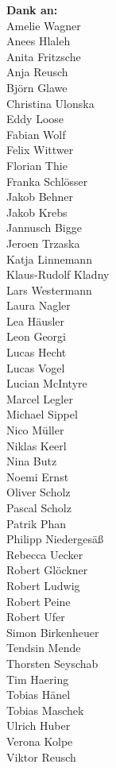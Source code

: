 \begin{minipage}[t][\textheight][b]{.25\textwidth}
\footnotesize
\raggedleft
\textbf{Dank an:}\\[1\baselineskip]
Amelie Wagner\\
Anees Hlaleh\\
Anita Fritzsche\\
Anja Reusch\\
Björn Glawe\\
Christina Ulonska\\
Eddy Loose\\
Fabian Wolf\\
Felix Wittwer\\
Florian Thie\\
Franka Schlösser\\
Jakob Behner\\
Jakob Krebs\\
Jannusch Bigge\\
Jeroen Trzaska\\
Katja Linnemann\\
Klaus-Rudolf Kladny\\
Lars Westermann\\
Laura Nagler\\
Lea Häusler\\
Leon Georgi\\
Lucas Hecht\\
Lucas Vogel\\
Lucian McIntyre\\
Marcel Legler\\
Michael Sippel\\
Nico Müller\\
Niklas Keerl\\
Nina Butz\\
Noemi Ernst\\
Oliver Scholz\\
Pascal Scholz\\
Patrik Phan\\
Philipp Niedergesäß\\
Rebecca Uecker\\
Robert Glöckner\\
Robert Ludwig\\
Robert Peine\\
Robert Ufer\\
Simon Birkenheuer\\
Tendsin Mende\\
Thorsten Seyschab\\
Tim Haering\\
Tobias Hänel\\
Tobias Maschek\\
Ulrich Huber\\
Verona Kolpe\\
Viktor Reusch
\end{minipage}

